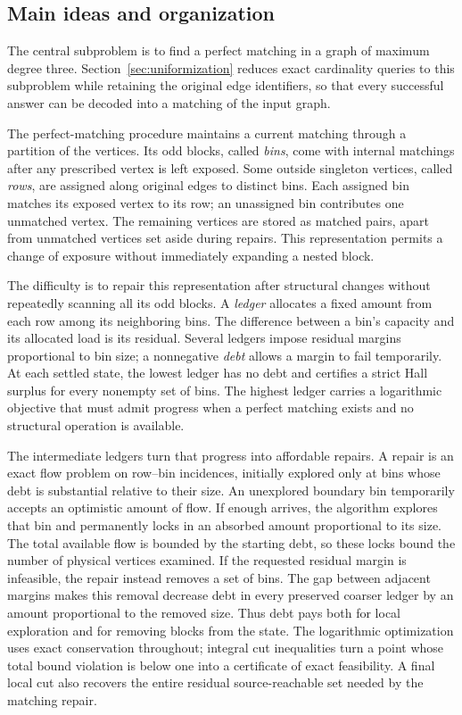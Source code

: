 \subsection{Main ideas and organization}

The central subproblem is to find a perfect matching in a graph of maximum
degree three.  Section~\ref{sec:uniformization} reduces exact cardinality
queries to this subproblem while retaining the original edge identifiers,
so that every successful answer can be decoded into a matching of the
input graph.

The perfect-matching procedure maintains a current matching through a
partition of the vertices.  Its odd blocks, called \emph{bins}, come with
internal matchings after any prescribed vertex is left exposed.
Some outside singleton vertices, called \emph{rows}, are assigned along
original edges to distinct bins.  Each assigned bin matches its exposed
vertex to its row; an unassigned bin contributes one unmatched vertex.
The remaining vertices are stored as matched pairs, apart from unmatched
vertices set aside during repairs.  This representation permits a change
of exposure without immediately expanding a nested block.

The difficulty is to repair this representation after structural changes
without repeatedly scanning all its odd blocks. A \emph{ledger} allocates
a fixed amount from each row among its neighboring bins. The difference
between a bin's capacity and its allocated load is its residual. Several
ledgers impose residual margins proportional to bin size; a nonnegative
\emph{debt} allows a margin to fail temporarily. At each settled state,
the lowest ledger has no debt and certifies a strict Hall surplus for
every nonempty set of bins. The highest ledger carries a logarithmic
objective that must admit progress when a perfect matching exists and no
structural operation is available.

The intermediate ledgers turn that progress into affordable repairs. A
repair is an exact flow problem on row--bin incidences, initially explored
only at bins whose debt is substantial relative to their size. An
unexplored boundary bin temporarily accepts an optimistic amount of flow.
If enough arrives, the algorithm explores that bin and permanently locks
in an absorbed amount proportional to its size. The total available flow
is bounded by the starting debt, so these locks bound the number of
physical vertices examined. If the requested residual margin is
infeasible, the repair instead removes a set of bins. The gap between
adjacent margins makes this removal decrease debt in every preserved
coarser ledger by an amount proportional to the removed size. Thus debt
pays both for local exploration and for removing blocks from the state.
The logarithmic optimization uses exact
conservation throughout; integral cut inequalities turn a point whose
total bound violation is below one into a certificate of exact
feasibility.  A final local cut also recovers the entire residual
source-reachable set needed by the matching repair.

